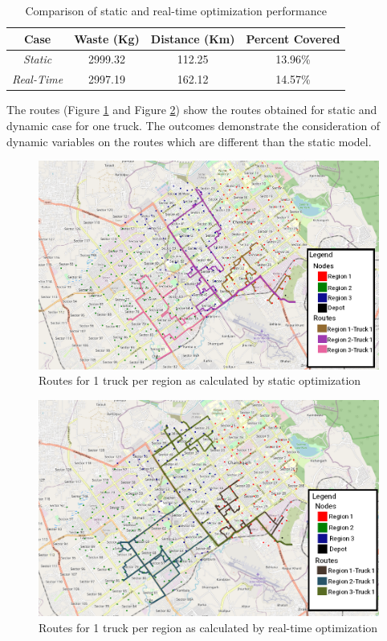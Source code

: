 \documentclass[12pt]{article}
\begin{document}
\begin{table}[H]
    \centering
    \caption{Comparison of static and real-time optimization performance} \label{tab5}
    \vspace*{0.3cm}
    \begin{tabular}{|c|c|c|c|}
        \hline Case & Waste (Kg) & Distance (Km) & Percent Covered\\
        \hline \textit{Static}& 2999.32& 112.25 & 13.96\%\\
        \hline \textit{Real-Time}& 2997.19 & 162.12 & 14.57\%\\
        \hline
    \end{tabular}
\end{table}

The routes (Figure \ref{fig4} and Figure \ref{fig5}) show the routes obtained for static and dynamic case for one truck. The outcomes demonstrate the consideration of dynamic variables on the routes which are different than the static model. 

\begin{figure}[H]
    \centering
    \includegraphics[scale=0.4]{Static_Unweighted.png} %
    \caption{Routes for 1 truck per region as calculated by static optimization}\label{fig4}
\end{figure}
\begin{figure}[H]
    \centering
    \includegraphics[scale=0.4]{Dynamic_weighted_1_Truck.png} %
    \caption{Routes for 1 truck per region as calculated by real-time optimization}\label{fig5}
\end{figure}
\end{document}
